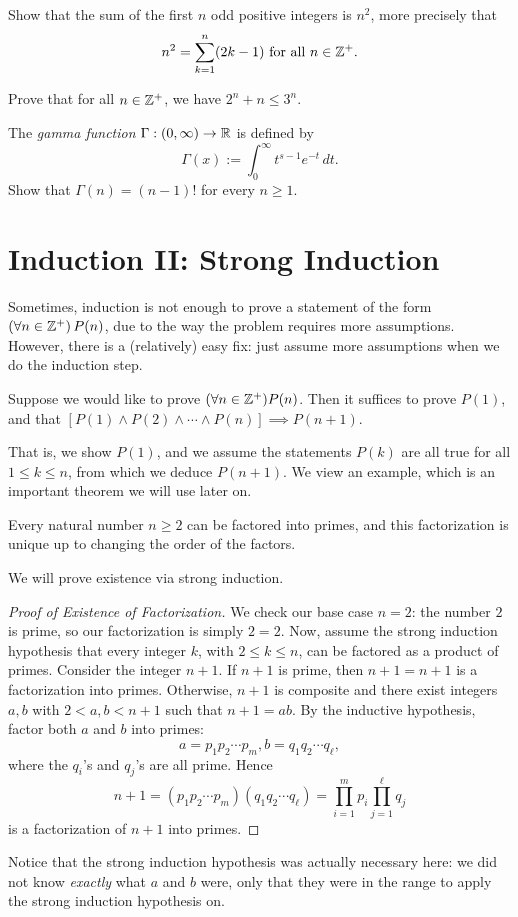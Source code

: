 \documentclass{article}
\begin{document}
\begin{exercise}
{Show that the sum of the first} $n$ {odd positive integers is} $n^2$, {more precisely} that
$$n^2 = \sum_{k=1}^{n} (2k-1) \textrm{ for all } n\in \mathbb Z^+.$$
\end{exercise}
\begin{exercise}
Prove that for all $n\in\mathbb Z^+$, we have $2^n + n \leq 3^n$.
\end{exercise}
\begin{exercise}
The \textit{gamma function} $\Gamma: (0, \infty) \to \mathbb R$ is defined by
$$\Gamma(x) := \int_0^\infty t^{s-1}e^{-t}\, dt.$$
Show that $\Gamma(n) = (n-1)!$ for every $n\geq 1$.
\end{exercise}
\section{Induction II: Strong Induction}
Sometimes, induction is not enough to prove a statement of the form $(\forall n\in\mathbb Z^+)\, P(n)$, due to the way the problem requires more assumptions. However, there is a (relatively) easy fix: just assume more assumptions when we do the induction step.
\begin{theorem}
Suppose we would like to prove $(\forall n\in\mathbb Z^+) P(n)$. Then it suffices to prove $P(1)$, and that $[P(1) \land P(2) \land \cdots \land P(n)] \implies P(n+1)$.
\end{theorem}
That is, we show $P(1)$, and we assume the statements $P(k)$ are all true for all $1\leq k \leq n$, from which we deduce $P(n+1)$. We view an example, which is an important theorem we will use later on.
\begin{theorem} \label{fundamental theorem of arithmetic}
Every natural number $n\geq 2$ can be factored into primes, and this factorization is unique up to changing the order of the factors.    
\end{theorem}
We will prove existence via strong induction.
\begin{proof}[Proof of Existence of Factorization]
We check our base case $n=2$: the number $2$ is prime, so our factorization is simply $2 = 2$. Now, assume the strong induction hypothesis that every integer $k$, with $2\leq k \leq n$, can be factored as a product of primes. Consider the integer $n+1$. If $n+1$ is prime, then $n+1 = n+1$ is a factorization into primes. Otherwise, $n+1$ is composite and there exist integers $a,b$ with $2 < a,b < n+1$ such that $n+1 = ab$. By the inductive hypothesis, factor both $a$ and $b$ into primes:
$$a = p_1p_2\cdots p_m, b = q_1q_2\cdots q_\ell,$$
where the $q_i$'s and $q_j$'s are all prime. Hence
$$n+1 = (p_1p_2\cdots p_m)(q_1q_2\cdots q_\ell) = \prod_{i=1}^m p_i \prod_{j=1}^\ell q_j$$
is a factorization of $n+1$ into primes.
\end{proof}
Notice that the strong induction hypothesis was actually necessary here: we did not know \textit{exactly} what $a$ and $b$ were, only that they were in the range to apply the strong induction hypothesis on.
\end{document}
